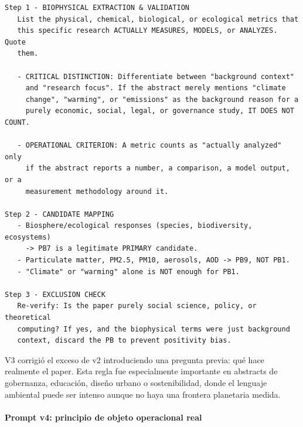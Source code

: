 {\footnotesize
\begin{verbatim}
Step 1 - BIOPHYSICAL EXTRACTION & VALIDATION
   List the physical, chemical, biological, or ecological metrics that
   this specific research ACTUALLY MEASURES, MODELS, or ANALYZES. Quote
   them.

   - CRITICAL DISTINCTION: Differentiate between "background context"
     and "research focus". If the abstract merely mentions "climate
     change", "warming", or "emissions" as the background reason for a
     purely economic, social, legal, or governance study, IT DOES NOT COUNT.

   - OPERATIONAL CRITERION: A metric counts as "actually analyzed" only
     if the abstract reports a number, a comparison, a model output, or a
     measurement methodology around it.

Step 2 - CANDIDATE MAPPING
   - Biosphere/ecological responses (species, biodiversity, ecosystems)
     -> PB7 is a legitimate PRIMARY candidate.
   - Particulate matter, PM2.5, PM10, aerosols, AOD -> PB9, NOT PB1.
   - "Climate" or "warming" alone is NOT enough for PB1.

Step 3 - EXCLUSION CHECK
   Re-verify: Is the paper purely social science, policy, or theoretical
   computing? If yes, and the biophysical terms were just background
   context, discard the PB to prevent positivity bias.
\end{verbatim}
}

V3 corrigió el exceso de v2 introduciendo una pregunta previa: qué hace realmente el paper. Esta regla fue especialmente importante en abstracts de gobernanza, educación, diseño urbano o sostenibilidad, donde el lenguaje ambiental puede ser intenso aunque no haya una frontera planetaria medida.

\paragraph{Prompt v4: principio de objeto operacional real}

